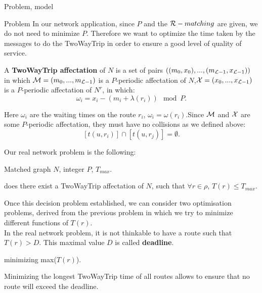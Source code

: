 \documentclass[a4paper,10pt]{report}
\begin{document}
\begin{chapter}{Problem, model}
\begin{section}{Problem}
In our network application, since $P$ and the ${\cal R}-matching$ are given, we do not need to minimize $P$.
Therefore we want to optimize the time taken by the messages to do the TwoWayTrip in order to ensure a good level of quality of service.

A {\bf TwoWayTrip affectation} of $N$ is a set of pairs $ ((m_0,x_0),...,(m_{{\cal L}-1},x_{{\cal L}-1}))$ in which ${\cal M} = (m_0,...,m_{{\cal L}-1})$ 
is a $P$-periodic affectation of $N$,${\cal X} = (x_0,...,x_{{\cal L}-1})$ is a $P$-periodic affectation of $N^r$, in which:
$$ \omega_i = x_i - (m_i + \lambda(r_i)) \mod P .$$ 

Here $\omega_i$ are the waiting times on the route $r_i$, $\omega_i = \omega(r_i)$.Since ${\cal M}$ and ${\cal X}$
are some $P$-periodic affectation, they must have no collisions as we defined above:
$$[t(u,r_i)] \cap [t(u,r_j)] = \emptyset .$$



Our real network problem is the following:\\


 Matched graph $N$, integer $P$, $ T_{max}$.

 does there exist a TwoWayTrip affectation of $N$, such that $\forall r \in \rho$, $T(r) \le T_{max}$.

Once this decision problem established, we can consider two optimisation problems, derived from the previous problem in which
we try to minimize different functions of $T(r)$.\\

In the real network problem, it is not thinkable to have a route such that $T(r) > D$. This maximal value $D$ is called {\bf deadline}.

 minimizing max($T(r)$).

Minimizing the longest TwoWayTrip time of all routes allows to ensure that no route will exceed the deadline.\\


\end{section}
\end{chapter}
\end{document}
